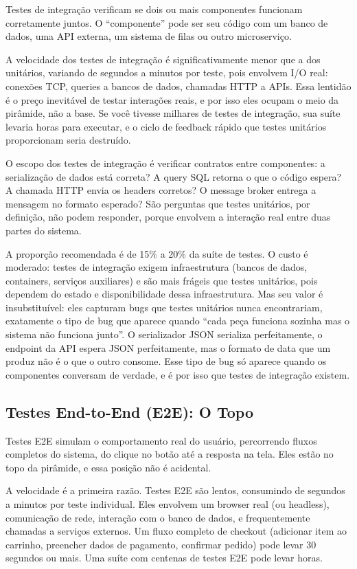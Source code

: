 Testes de integração verificam se dois ou mais componentes funcionam corretamente
juntos. O ``componente'' pode ser seu código com um banco de dados, uma API
externa, um sistema de filas ou outro microserviço.

A velocidade dos testes de integração é significativamente menor que a dos
unitários, variando de segundos a minutos por teste, pois envolvem I/O real:
conexões TCP, queries a bancos de dados, chamadas HTTP a APIs. Essa lentidão
é o preço inevitável de testar interações reais, e por isso
eles ocupam o meio da pirâmide, não a base. Se você tivesse milhares de testes
de integração, sua suíte levaria horas para executar, e o ciclo de feedback
rápido que testes unitários proporcionam seria destruído.

O escopo dos testes de integração é verificar contratos entre componentes: a
serialização de dados está correta? A query SQL retorna o que o código espera?
A chamada HTTP envia os headers corretos? O message broker entrega a mensagem
no formato esperado? São perguntas que testes unitários, por definição, não
podem responder, porque envolvem a interação real entre duas partes do sistema.

A proporção recomendada é de 15\% a 20\% da suíte de testes. O custo é
moderado: testes de integração exigem infraestrutura (bancos de dados,
containers, serviços auxiliares) e são mais frágeis que testes unitários, pois
dependem do estado e disponibilidade dessa infraestrutura. Mas seu valor é
insubstituível: eles capturam bugs que testes unitários nunca encontrariam,
exatamente o tipo de bug que aparece quando ``cada peça funciona sozinha mas o
sistema não funciona junto''. O serializador JSON serializa perfeitamente, o
endpoint da API espera JSON perfeitamente, mas o formato de data que um produz
não é o que o outro consome. Esse tipo de bug só aparece quando os componentes
conversam de verdade, e é por isso que testes de integração existem.

\subsection{Testes End-to-End (E2E): O Topo}

Testes E2E simulam o comportamento real do usuário, percorrendo fluxos completos
do sistema, do clique no botão até a resposta na tela. Eles estão no topo da
pirâmide, e essa posição não é acidental.

A velocidade é a primeira razão. Testes E2E são lentos, consumindo de segundos a
minutos por teste individual. Eles envolvem um browser real (ou headless),
comunicação de rede, interação com o banco de dados, e frequentemente chamadas
a serviços externos. Um fluxo completo de checkout (adicionar item ao
carrinho, preencher dados de pagamento, confirmar pedido) pode levar 30
segundos ou mais. Uma suíte com centenas de testes E2E pode levar horas.

